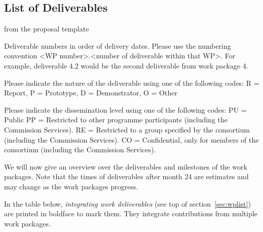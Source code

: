 \subsection{List of Deliverables}\label{sec:deliverables}

\begin{todo}{from the proposal template}
\begin{compactenum}
\item Deliverable numbers in order of delivery dates. Please use the numbering convention <WP number>.<number of deliverable within
that WP>. For example, deliverable 4.2 would be the second deliverable from work package 4.
\item Please indicate the nature of the deliverable using one of the following codes:
R = Report, P = Prototype, D = Demonstrator, O = Other
\item Please indicate the dissemination level using one of the following codes:
PU = Public
PP = Restricted to other programme participants (including the Commission Services).
RE = Restricted to a group specified by the consortium (including the Commission Services).
CO = Confidential, only for members of the consortium (including the Commission Services).
\end{compactenum}
\end{todo}
We will now give an overview over the deliverables and milestones of the work
packages. Note that the times of deliverables after month 24 are estimates and may change
as the work packages progress.

In the table below, \emph{integrating work deliverables} (see top of
section~\ref{sec:wplist}) are printed in boldface to mark them. They integrate
contributions from multiple work packages.

{\footnotesize{}}


